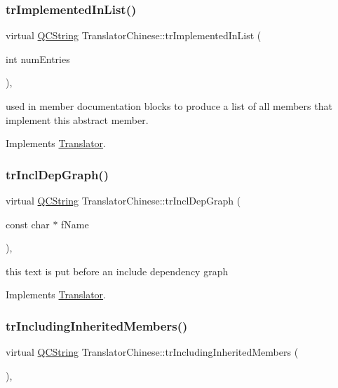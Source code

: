 \subsubsection{\texorpdfstring{trImplementedInList()}{trImplementedInList()}}
{\footnotesize\ttfamily virtual \mbox{\hyperlink{class_q_c_string}{Q\+C\+String}} Translator\+Chinese\+::tr\+Implemented\+In\+List (\begin{DoxyParamCaption}\item[{int}]{num\+Entries }\end{DoxyParamCaption})\hspace{0.3cm}{\ttfamily [inline]}, {\ttfamily [virtual]}}

used in member documentation blocks to produce a list of all members that implement this abstract member. 

Implements \mbox{\hyperlink{class_translator}{Translator}}.

\mbox{\label{class_translator_chinese_ad3bfb463e7c9012d1ac9dbbcfeccceb7}} 
\subsubsection{\texorpdfstring{trInclDepGraph()}{trInclDepGraph()}}
{\footnotesize\ttfamily virtual \mbox{\hyperlink{class_q_c_string}{Q\+C\+String}} Translator\+Chinese\+::tr\+Incl\+Dep\+Graph (\begin{DoxyParamCaption}\item[{const char $\ast$}]{f\+Name }\end{DoxyParamCaption})\hspace{0.3cm}{\ttfamily [inline]}, {\ttfamily [virtual]}}

this text is put before an include dependency graph 

Implements \mbox{\hyperlink{class_translator}{Translator}}.

\mbox{\label{class_translator_chinese_a791614cc46908f5a5e4e70b5b0bd6731}} 
\subsubsection{\texorpdfstring{trIncludingInheritedMembers()}{trIncludingInheritedMembers()}}
{\footnotesize\ttfamily virtual \mbox{\hyperlink{class_q_c_string}{Q\+C\+String}} Translator\+Chinese\+::tr\+Including\+Inherited\+Members (\begin{DoxyParamCaption}{ }\end{DoxyParamCaption})\hspace{0.3cm}{\ttfamily [inline]}, {\ttfamily [virtual]}}

